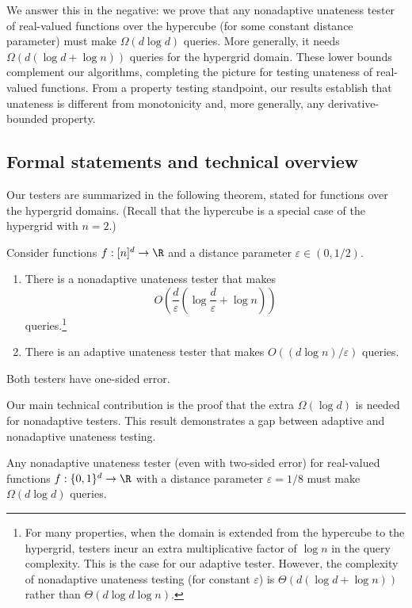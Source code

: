 \documentclass{toc}
\newcommand{\eps}{\varepsilon}
\begin{document}
We answer this in the negative: we prove that any nonadaptive unateness tester of real-valued functions over the hypercube (for some constant distance parameter) must make $\Omega(d\log d)$ queries.
More generally, it needs $\Omega(d(\log d+\log n))$ queries for the hypergrid domain. These lower bounds complement our algorithms, completing the picture for testing unateness of real-valued functions.
{}From a property testing standpoint, our results establish that unateness is different from
monotonicity and, more generally, any derivative-bounded
property.

\subsection{Formal statements and technical overview}
Our testers are summarized in the following theorem, stated for functions over the hypergrid domains. (Recall that the hypercube is a special case of the hypergrid with $n=2$.)

\begin{theorem}\label{thm:main-hg}
	Consider functions $f:[n]^d \to \R$ and a distance parameter $\eps\in (0,1/2)$.
	\begin{enumerate}
        \item\label{item:nonadaptive} There is a nonadaptive unateness tester that makes
          \[
            O\left(\frac d \eps\left(\log\frac d\eps + \log n\right)\right)
          \]
          queries.\footnote{For many properties, when the domain is
            extended from the hypercube to the hypergrid, testers
            incur an extra multiplicative factor of $\log n$ in the
            query complexity. This is the case for our adaptive
            tester.  However, the complexity of nonadaptive unateness
            testing (for constant $\eps$) is
            $\Theta(d(\log d + \log n))$ rather than
            $\Theta(d\log d\log n)$.}
		
		\item\label{item:adaptive} There is an adaptive unateness tester  that makes $O(({d\log n})/\eps)$ queries.
	\end{enumerate}
	Both testers have one-sided error.
\end{theorem}

Our main technical contribution is the proof that the extra $\Omega(\log d)$ is needed for nonadaptive testers.
This result demonstrates a gap between adaptive and nonadaptive unateness testing.
\begin{theorem}\label{thm:non-adap-lb-1}
Any nonadaptive unateness tester (even with two-sided error) for real-valued functions $f:\{0,1\}^d \to \R$ with
a %
distance parameter $\eps = 1/8$  must make $\Omega(d\log d)$ queries.
\end{theorem}
\end{document}
